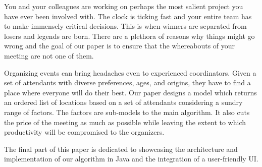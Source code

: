 You and your colleagues are working on perhaps the most salient project you have ever been involved with. The clock is ticking fast and your entire team has to make immensely critical decisions. This is when winners are separated from losers and legends are born. There are a plethora of reasons why things might go wrong and the goal of our paper is to ensure that the whereabouts of your meeting are not one of them. 

Organizing events can bring headaches even to experienced coordinators. Given a set of attendants with diverse preferences, ages, and origins, they have to find a place where everyone will do their best. Our paper designs a model which returns an ordered list of locations based on a set of attendants considering a sundry range of factors. The factors are sub-models to the main algorithm. It also cuts the price of the meeting as much as possible while leaving the extent to which productivity will be compromised to the organizers.

The final part of this paper is dedicated to showcasing the architecture and implementation of our algorithm in Java and the integration of a user-friendly UI.













